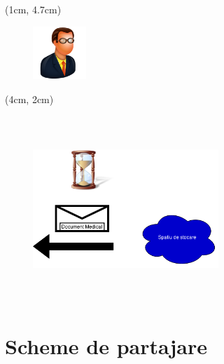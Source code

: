 \documentclass{beamer}
\theoremstyle{definition}
\begin{document}
\begin{frame}
{        \begin{textblock*}{2cm}(1cm, 4.7cm)
        \begin{figure}
            \includegraphics[width=2cm,height=2cm,keepaspectratio]{img/motivation/old-128.png}
        \end{figure}
        \end{textblock*}
    }
     {

        \begin{textblock*}{4cm}(4cm, 2cm)
        \begin{figure}
            \includegraphics[width=7cm,height=7cm,keepaspectratio]{img/motivation/after_system.png}
        \end{figure}
        \end{textblock*}
    }
\end{frame}

\section{Scheme de partajare}
\end{document}
